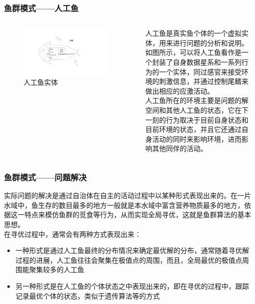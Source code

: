 \begin{frame}
	\frametitle{鱼群模式——人工鱼}
	\begin{columns}
		\begin{figure}
			\centering
			\includegraphics[width=0.9\textwidth]{pic/fish2.pdf}
			\caption{人工鱼实体}
		\end{figure}
		人工鱼是真实鱼个体的一个虚拟实体，用来进行问题的分析和说明。\\如图所示，可以将人工鱼看作是一个封装了自身数据星系和一系列行为的一个实体，同过感官来接受环境的刺激信息，并通过控制尾鳍来做出相应的应激活动。\\人工鱼所在的环境主要是问题的解空间和其他人工鱼的状态，它在下一刻的行为取决于目前自身状态和目前环境的状态，并且它还通过自身活动的同时来影响环境，进而影响其他同伴的活动。
	\end{columns}
		
\end{frame}
\begin{frame}
	\frametitle{鱼群模式——问题解决}
	实际问题的解决是通过自治体在自主的活动过程中以某种形式表现出来的。在一片水域中，鱼生存的数目最多的地方一般就是本水域中富含营养物质最多的地方，依据这一特点来模仿鱼群的觅食等行为，从而实现全局寻优，这就是鱼群算法的基本思想。\\在寻优过程中，通常会有两种方式表现出来：
	\begin{itemize}
		\item{一种形式是通过人工鱼最终的分布情况来确定最优解的分布，通常随着寻优解过程的进展，人工鱼往往会聚集在极值点的周围，而且，全局最优的极值点周围能聚集较多的人工鱼}
		\item{另一种形式是在人工鱼的个体状态之中表现出来的，即在寻优的过程中，跟踪记录最优个体的状态，类似于遗传算法等的方式}
	\end{itemize}
\end{frame}
